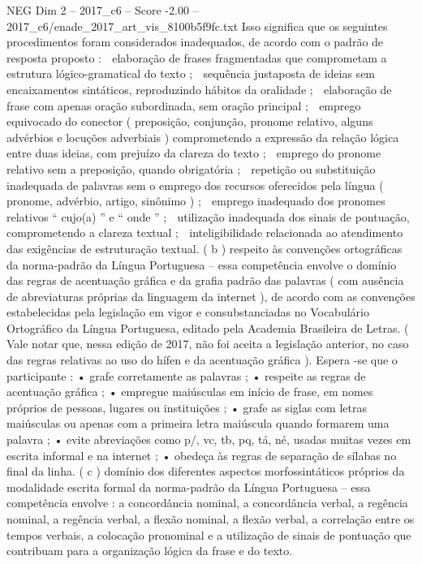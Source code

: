 \begin{textsample}{NEG Dim 2 – 2017\_c6 – Score -2.00 – 2017\_c6/enade\_2017\_art\_vis\_8100b5f9fc.txt}
Isso significa que os seguintes procedimentos foram considerados inadequados, de acordo com o padrão de resposta proposto :  elaboração de frases fragmentadas que comprometam a estrutura lógico-gramatical do texto ;  sequência justaposta de ideias sem encaixamentos sintáticos, reproduzindo hábitos da oralidade ;  elaboração de frase com apenas oração subordinada, sem oração principal ;  emprego equivocado do conector ( preposição, conjunção, pronome relativo, alguns advérbios e locuções adverbiais ) comprometendo a expressão da relação lógica entre duas ideias, com prejuízo da clareza do texto ;  emprego do pronome relativo sem a preposição, quando obrigatória ;  repetição ou substituição inadequada de palavras sem o emprego dos recursos oferecidos pela língua ( pronome, advérbio, artigo, sinônimo ) ;  emprego inadequado dos pronomes relativos “ cujo(a) ” e “ onde ” ;  utilização inadequada dos sinais de pontuação, comprometendo a clareza textual ;  inteligibilidade relacionada ao atendimento das exigências de estruturação textual. ( b ) respeito às convenções ortográficas da norma-padrão da Língua Portuguesa – essa competência envolve o domínio das regras de acentuação gráfica e da grafia padrão das palavras ( com ausência de abreviaturas próprias da linguagem da internet ), de acordo com as convenções estabelecidas pela legislação em vigor e consubstanciadas no Vocabulário Ortográfico da Língua Portuguesa, editado pela Academia Brasileira de Letras. ( Vale notar que, nessa edição de 2017, não foi aceita a legislação anterior, no caso das regras relativas ao uso do hífen e da acentuação gráfica ).
Espera -se que o participante : • grafe corretamente as palavras ; • respeite as regras de acentuação gráfica ; • empregue maiúsculas em início de frase, em nomes próprios de pessoas, lugares ou instituições ; • grafe as siglas com letras maiúsculas ou apenas com a primeira letra maiúscula quando formarem uma palavra ; • evite abreviações como p/, vc, tb, pq, tá, né, usadas muitas vezes em escrita informal e na internet ; • obedeça às regras de separação de sílabas no final da linha. ( c ) domínio dos diferentes aspectos morfossintáticos próprios da modalidade escrita formal da norma-padrão da Língua Portuguesa – essa competência envolve : a concordância nominal, a concordância verbal, a regência nominal, a regência verbal, a flexão nominal, a flexão verbal, a correlação entre os tempos verbais, a colocação pronominal e a utilização de sinais de pontuação que contribuam para a organização lógica da frase e do texto.

\end{textsample}
